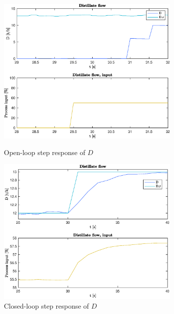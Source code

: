 \documentclass[12pt]{article}
\begin{document}
\begin{figure}
\centering
\includegraphics[width=0.8\textwidth]{../Systemanalyse/Log_Data_to_Matlab/Figurer/Stegeksperimenter/FC1005.eps}
\caption{Open-loop step response of $D$}
\label{fig:ol_step_FC1005}

\includegraphics[width=0.8\textwidth]{../Systemanalyse/Log_Data_to_Matlab/Figurer/Stegeksperimenter/FC1005_step.eps}
\caption{Closed-loop step response of $D$}
\label{fig:cl_step_FC1005}
\end{figure}
\end{document}
